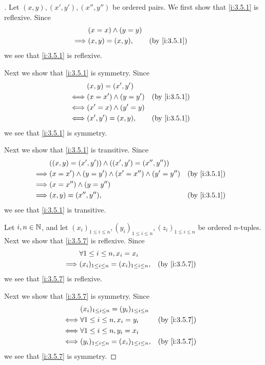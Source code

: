 \begin{proof}[]
  Let \((x, y), (x', y'), (x'', y'')\) be ordered pairs.
  We first show that \cref{i:3.5.1} is reflexive.
  Since
  \begin{align*}
             & (x = x) \land (y = y)                   \\
    \implies & (x, y) = (x, y),      &  & \by{i:3.5.1}
  \end{align*}
  we see that \cref{i:3.5.1} is reflexive.

  Next we show that \cref{i:3.5.1} is symmetry.
  Since
  \begin{align*}
         & (x, y) = (x', y')                         \\
    \iff & (x = x') \land (y = y') &  & \by{i:3.5.1} \\
    \iff & (x' = x) \land (y' = y)                   \\
    \iff & (x', y') = (x, y),      &  & \by{i:3.5.1}
  \end{align*}
  we see that \cref{i:3.5.1} is symmetry.

  Next we show that \cref{i:3.5.1} is transitive.
  Since
  \begin{align*}
             & ((x, y) = (x', y')) \land ((x', y') = (x'', y''))                           \\
    \implies & (x = x') \land (y = y') \land (x' = x'') \land (y' = y'') &  & \by{i:3.5.1} \\
    \implies & (x = x'') \land (y = y'')                                                   \\
    \implies & (x, y) = (x'', y''),                                      &  & \by{i:3.5.1}
  \end{align*}
  we see that \cref{i:3.5.1} is transitive.

  Let \(i, n \in \mathbb{N}\), and let \((x_i)_{1 \leq i \leq n}, (y_i)_{1 \leq i \leq n}, (z_i)_{1 \leq i \leq n}\) be ordered \(n\)-tuples.
  Next we show that \cref{i:3.5.7} is reflexive.
  Since
  \begin{align*}
             & \forall 1 \leq i \leq n, x_i = x_i                                   \\
    \implies & (x_i)_{1 \leq i \leq n} = (x_i)_{1 \leq i \leq n}, &  & \by{i:3.5.7}
  \end{align*}
  we see that \cref{i:3.5.7} is reflexive.

  Next we show that \cref{i:3.5.7} is symmetry.
  Since
  \begin{align*}
         & (x_i)_{1 \leq i \leq n} = (y_i)_{1 \leq i \leq n}                    \\
    \iff & \forall 1 \leq i \leq n, x_i = y_i                 &  & \by{i:3.5.7} \\
    \iff & \forall 1 \leq i \leq n, y_i = x_i                                   \\
    \iff & (y_i)_{1 \leq i \leq n} = (x_i)_{1 \leq i \leq n}, &  & \by{i:3.5.7}
  \end{align*}
  we see that \cref{i:3.5.7} is symmetry.


\end{proof}
